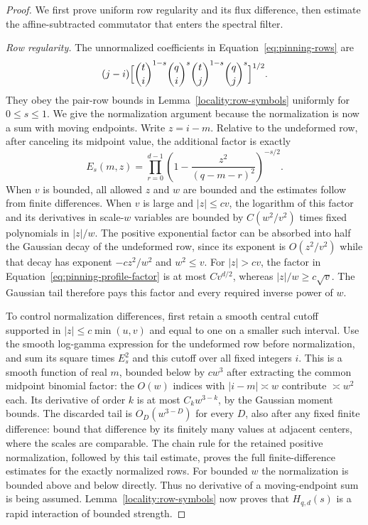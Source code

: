 \begin{proof}
We first prove uniform row regularity and its flux difference, then
estimate the affine-subtracted commutator that enters the spectral
filter.

\emph{Row regularity.}
The unnormalized coefficients in Equation~\eqref{eq:pinning-rows} are
\[
 (j-i)\Bigl[
  \binom ti^{1-s}\binom qi^s
  \binom tj^{1-s}\binom qj^s\Bigr]^{1/2}.
\]
They obey the pair-row bounds in Lemma~\ref{locality:row-symbols}
uniformly for $0\le s\le1$.  We give the normalization argument because
the normalization is now a sum with moving endpoints.  Write $z=i-m$.
Relative to the undeformed row, after canceling its midpoint value, the
additional factor is exactly
\begin{equation}
 E_s(m,z)=\prod_{r=0}^{d-1}
       \left(1-\frac{z^2}{(q-m-r)^2}\right)^{-s/2}.
 \label{eq:pinning-profile-factor}
\end{equation}
When $v$ is bounded, all allowed $z$ and $w$ are bounded and the estimates
follow from finite differences.  When $v$ is large and $|z|\le c v$,
the logarithm of this factor and its derivatives in scale-$w$ variables
are bounded by $C(w^2/v^2)$ times fixed polynomials in $|z|/w$.
The positive exponential factor can be absorbed into half the Gaussian
decay of the undeformed row, since its exponent is $O(z^2/v^2)$ while
that decay has exponent $-c z^2/w^2$ and $w^2\le v$.
For $|z|>c v$, the factor in
Equation~\eqref{eq:pinning-profile-factor} is at most $C v^{d/2}$,
whereas $|z|/w\ge c\sqrt v$.  The Gaussian tail therefore pays this
factor and every required inverse power of $w$.

To control normalization differences, first retain a smooth central
cutoff supported in $|z|\le c\min(u,v)$ and equal to one on a smaller
such interval.  Use the smooth log-gamma expression for the undeformed
row before normalization, and sum its square times $E_s^2$ and this
cutoff over all fixed integers $i$.  This is a smooth function of real
$m$, bounded below by $c w^3$ after extracting the common midpoint
binomial factor: the $O(w)$ indices with $|i-m|\asymp w$ contribute
$\asymp w^2$ each.  Its derivative of order $k$ is at most
$C_k w^{3-k}$, by the Gaussian moment bounds.  The discarded tail is
$O_D(w^{3-D})$ for every $D$, also after any fixed finite difference:
bound that difference by its finitely many values at adjacent centers,
where the scales are comparable.  The chain rule for the retained
positive normalization, followed by this tail estimate, proves the
full finite-difference estimates for the exactly normalized rows.
For bounded $w$ the normalization is bounded above and below directly.
Thus no derivative of a moving-endpoint sum is being assumed.
Lemma~\ref{locality:row-symbols} now proves that $H_{q,d}(s)$ is a rapid
interaction of bounded strength.


\end{proof}
